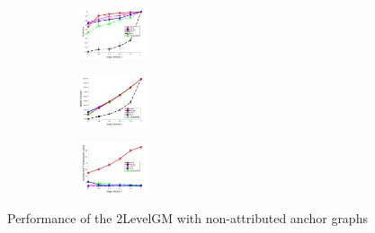 \documentclass[hyperref={pdfpagelabels=false}]{beamer}
\begin{document}
\begin{frame}[allowframebreaks]
\begin{figure}
\begin{subfigure}[b]{0.32\textwidth}
		\end{subfigure} 	
\end{figure}
\vspace{-20pt}
\begin{figure}
		\begin{subfigure}[b]{0.32\textwidth}
			\centering
			\includegraphics[width=2cm]{"fig/evaluation/SyntheticTest/no_descr/Results_v4.3.3/Test4/accuracy_avg10t"} 
		\end{subfigure}%
		\begin{subfigure}[b]{0.32\textwidth}
			\centering
			\includegraphics[width=2cm]{"fig/evaluation/SyntheticTest/no_descr/Results_v4.3.3/Test4/score_avg10t"} 
		\end{subfigure} 
		\begin{subfigure}[b]{0.32\textwidth}
			\centering
			\includegraphics[width=2cm]{"fig/evaluation/SyntheticTest/no_descr/Results_v4.3.3/Test4/time_summary_avg10t"} 
		\end{subfigure} 	
\end{figure}

Performance of the 2LevelGM with non-attributed anchor graphs

\framebreak



\end{frame}
\end{document}
